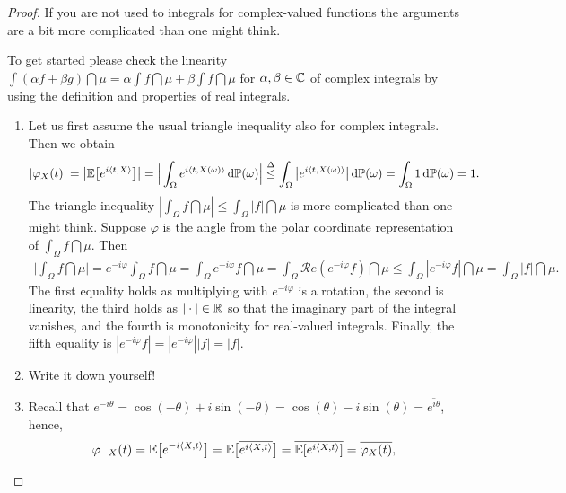 \begin{proof}[Proof]
	If you are not used to integrals for complex-valued functions the arguments are a bit more complicated than one might think.
	\begin{luebung}
		To get started please check the linearity $\int (\alpha f+\beta g)\dint \mu=\alpha \int f \dint \mu+\beta \int f \dint \mu$ for $\alpha, \beta \in\mathbb{C}$ of complex integrals by using the definition and properties of real integrals.
	\end{luebung}
	\begin{enumerate}[label=(\roman*)]
		\item Let us first assume the usual triangle inequality also for complex integrals. Then we obtain
			\begin{align*}
				\lvert \varphi_X(t) \rvert 
				= \big| \mathbb{E} \big[ e^{i \langle t,X \rangle} \big] \big| 
				= \Big| \int_{\Omega} e^{i \langle t, X(\omega) \rangle} \, \mathrm{d} \mathbb{P}(\omega) \Big|
				\overset{\Delta}{\leq} \int_{\Omega} \big| e^{i \langle t, X(\omega) \rangle} \big| \, \mathrm{d} \mathbb{P}(\omega)
				= \int_\Omega 1\, \mathrm{d} \mathbb P(\omega) = 1.
			\end{align*}
			The triangle inequality $|\int_\Omega f\dint \mu|\leq \int_\Omega |f|\dint \mu$ is more complicated than one might think. Suppose $\varphi$ is the angle from the polar coordinate representation of $\int_\Omega f\dint \mu$. Then
			\begin{align*}
				\Big|\int_\Omega f \dint \mu \Big| = e^{-i\varphi} \int_\Omega f \dint \mu
				=\int_\Omega e^{-i\varphi} f \dint \mu
				=\int_\Omega \mathcal{R}e(e^{-i\varphi} f) \dint \mu
				\leq \int_\Omega |e^{-i\varphi} f| \dint \mu
				= \int_\Omega  |f| \dint \mu.
			\end{align*}
			The first equality holds as multiplying with $e^{-i\varphi}$ is a rotation, the second is linearity, the third holds as $|\cdot|\in \mathbb{R}$ so that the imaginary part of the integral vanishes, and the fourth is monotonicity for real-valued integrals. Finally, the fifth equality is $|e^{-i\varphi}f|=|e^{-i\varphi}||f|=|f|$.
		\item
			Write it down yourself!
		\item Recall that
			$e^{-i\theta} = \cos(-\theta) + i \sin(-\theta) = \cos(\theta) - i \sin(\theta) = \overline{e^{i \theta}}$, hence, 
			\begin{align*}
				\varphi_{-X}(t) = \E \big[ e^{-i \langle X, t \rangle} \big] = \E \big[ \overline{ e^{i \langle X, t \rangle}} \big] = \overline{\E [ e^{i \langle X, t \rangle}]} = \overline{\varphi_X(t)},

\end{align*}
\end{enumerate}
\end{proof}
